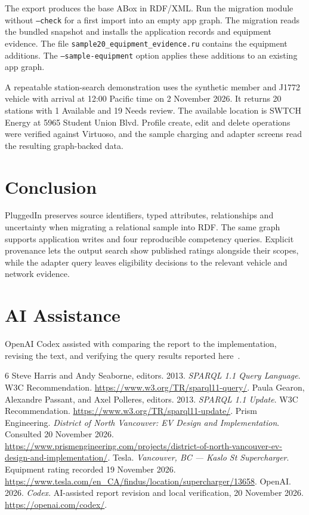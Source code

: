 \documentclass[sigconf,nonacm]{acmart}
\begin{document}
The export produces the base ABox in RDF/XML. Run the migration module without \texttt{--check} for a first import into an empty app graph. The migration reads the bundled snapshot and installs the application records and equipment evidence. The file \texttt{sample20\_equipment\_evidence.ru} contains the equipment additions. The \texttt{--sample-equipment} option applies these additions to an existing app graph.

A repeatable station-search demonstration uses the synthetic member and J1772 vehicle with arrival at 12:00 Pacific time on 2 November 2026. It returns 20 stations with 1 Available and 19 Needs review. The available location is SWTCH Energy at 5965 Student Union Blvd. Profile create, edit and delete operations were verified against Virtuoso, and the sample charging and adapter screens read the resulting graph-backed data.

\section{Conclusion}

PluggedIn preserves source identifiers, typed attributes, relationships and uncertainty when migrating a relational sample into RDF. The same graph supports application writes and four reproducible competency queries. Explicit provenance lets the output search show published ratings alongside their scopes, while the adapter query leaves eligibility decisions to the relevant vehicle and network evidence.

\section*{AI Assistance}
OpenAI Codex assisted with comparing the report to the implementation, revising the text, and verifying the query results reported here~\cite{codex}.

\begin{thebibliography}{6}
 Steve Harris and Andy Seaborne, editors. 2013. \emph{SPARQL 1.1 Query Language}. W3C Recommendation. \url{https://www.w3.org/TR/sparql11-query/}.
 Paula Gearon, Alexandre Passant, and Axel Polleres, editors. 2013. \emph{SPARQL 1.1 Update}. W3C Recommendation. \url{https://www.w3.org/TR/sparql11-update/}.
 Prism Engineering. \emph{District of North Vancouver: EV Design and Implementation}. Consulted 20 November 2026. \url{https://www.prismengineering.com/projects/district-of-north-vancouver-ev-design-and-implementation/}.
 Tesla. \emph{Vancouver, BC --- Kaslo St Supercharger}. Equipment rating recorded 19 November 2026. \url{https://www.tesla.com/en_CA/findus/location/supercharger/13658}.
 OpenAI. 2026. \emph{Codex}. AI-assisted report revision and local verification, 20 November 2026. \url{https://openai.com/codex/}.
\end{thebibliography}
\end{document}
